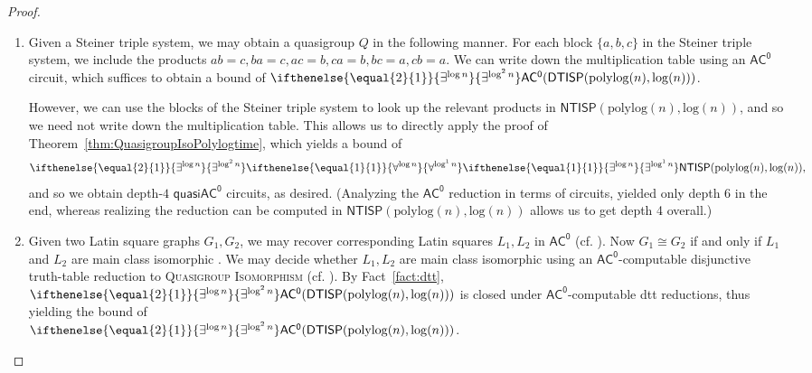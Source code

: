 \documentclass{theoretics}
\newcommand{\algprobm}[1]{\textsc{#1}\xspace}
\newcommand{\betacc}[1]{\ifthenelse{\equal{#1}{1}}{\exists^{\log n}}{\exists^{\log^{#1}n}}} %
\newcommand{\alphacc}[1]{\ifthenelse{\equal{#1}{1}}{\forall^{\log n}}{\forall^{\log^{#1}n}}} %
\newcommand*{\ComplexityClass}[1]{\ensuremath{\mathsf{#1}}\xspace}
\newcommand{\NTISP}{\ComplexityClass{NTISP}}
\newcommand{\DTISP}{\ComplexityClass{DTISP}}
\newcommand{\NTISPpll}{\ensuremath{\NTISP(\mathrm{polylog}(n),\mathrm{log}(n))}\xspace}
\newcommand{\DTISPpll}{\ensuremath{\DTISP(\mathrm{polylog}(n),\mathrm{log}(n))}\xspace}
\newcommand{\ACz}{\ComplexityClass{AC^0}}
\newcommand{\qACz}{\ComplexityClass{quasiAC^0}}
\begin{document}
\begin{proof}
\begin{enumerate}[label=(\alph*)]
We can check in $\DTISPpll$ whether $g' h' = \ell'$. Similar to the proof of Theorem~\ref{thm:QuasigroupIsoPolylogtime}, we can combine the two $\alphacc{1}$ blocks into one $\alphacc{1}$ block, as the check whether $(\bar{a}, \bar{b}, \bar{c}) \mapsto (\bar{a'}, \bar{b'}, \bar{c'})$ preserves the quasigroup operation (the \emph{homotopism} condition) is independent of whether each of $\bar{a}, \bar{b}, \bar{c}$ generates $Q_1$, and each of $\bar{a'}, \bar{b'}, \bar{c'}$ generates $Q_2$. 

By Fact~\ref{fact:NTISP}, an $\NTISPpll$ machine can be simulated by a depth-$2$ $\qACz$ circuit, taking care of the final $\betacc{1}\DTISPpll$. The additional quantifiers $\betacc{2}\alphacc{1}$ then yield depth-$4$ $\qACz$ circuits. 

\item Given a Steiner triple system, we may obtain a quasigroup $Q$ in the following manner. For each block $\{a,b,c\}$ in the Steiner triple system, we include the products $ab = c, ba = c, ac = b, ca = b, bc = a, cb = a$. We can write down the multiplication table using an $\ACz$ circuit, which suffices to obtain a bound of $\betacc{2}\ACz(\DTISPpll)$. 

However, we can use the blocks of the Steiner triple system to look up the relevant products in $\NTISPpll$, and so we need not write down the multiplication table. This allows us to directly apply the proof of Theorem~\ref{thm:QuasigroupIsoPolylogtime}, which yields a bound of 
\[
\betacc{2}\alphacc{1}\betacc{1}\NTISPpll,
\]
and so we obtain depth-$4$ $\qACz$ circuits, as desired. (Analyzing the $\ACz$ reduction in terms of circuits, yielded only depth 6 in the end, whereas realizing the reduction can be computed in $\NTISPpll$ allows us to get depth 4 overall.)

\item Given two Latin square graphs $G_{1}, G_{2}$, we may recover corresponding Latin squares $L_{1}, L_{2}$ in $\ACz$ (cf. \cite[Lemma~3.9]{LevetLatinSquares}). Now $G_{1} \cong G_{2}$ if and only if $L_{1}$ and $L_{2}$ are main class isomorphic \cite[Lemma~3]{MillerTarjan}. We may decide whether $L_{1}, L_{2}$ are main class isomorphic using an $\ACz$-computable disjunctive truth-table reduction to \algprobm{Quasigroup Isomorphism} (cf. \cite[Remark~1.6]{LevetLatinSquares}). By Fact~\ref{fact:dtt},  $\betacc{2}\ACz(\DTISPpll)$ is closed under $\ACz$-computable dtt reductions, thus yielding the bound of \\$\betacc{2}\ACz(\DTISPpll)$.



\end{enumerate}
\end{proof}
\end{document}
